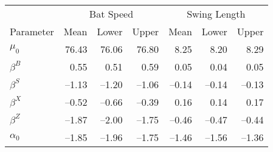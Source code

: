 \begin{tabular}{l|rrr|rrr|}
    & \multicolumn{3}{c|}{Bat Speed}          & \multicolumn{3}{c|}{Swing Length}  \\
  Parameter & Mean  & Lower  & Upper & Mean  & Lower  & Upper \\
  \hline
  $\mu_0$ & 76.43 & 76.06 & 76.80 & 8.25 & 8.20 & 8.29 \\
  $\beta^B$ & 0.55 & 0.51 & 0.59 & 0.05 & 0.04 & 0.05 \\
  $\beta^S$ & --1.13 & --1.20 & --1.06 & --0.14 & --0.14 & --0.13 \\
  $\beta^X$ & --0.52 & --0.66 & --0.39 & 0.16 & 0.14 & 0.17 \\
  $\beta^Z$ & --1.87 & --2.00 & --1.75 & --0.46 & --0.47 & --0.44 \\
  $\alpha_0$ & --1.85 & --1.96 & --1.75 & --1.46 & --1.56 & --1.36 \\
\end{tabular}